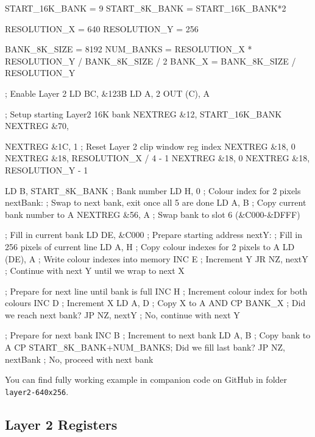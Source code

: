 \begin{tcblisting}{}
START_16K_BANK  = 9
START_8K_BANK   = START_16K_BANK*2

RESOLUTION_X    = 640
RESOLUTION_Y    = 256

BANK_8K_SIZE    = 8192
NUM_BANKS       = RESOLUTION_X * RESOLUTION_Y / BANK_8K_SIZE / 2
BANK_X          = BANK_8K_SIZE / RESOLUTION_Y

    ; Enable Layer 2
    LD BC, &123B
    LD A, 2
    OUT (C), A

    ; Setup starting Layer2 16K bank
    NEXTREG &12, START_16K_BANK
    NEXTREG &70, %

    NEXTREG &1C, 1            ; Reset Layer 2 clip window reg index
    NEXTREG &18, 0
    NEXTREG &18, RESOLUTION_X / 4 - 1
    NEXTREG &18, 0
    NEXTREG &18, RESOLUTION_Y - 1

    LD B, START_8K_BANK       ; Bank number
    LD H, 0                   ; Colour index for 2 pixels
nextBank:
    ; Swap to next bank, exit once all 5 are done
    LD A, B                   ; Copy current bank number to A
    NEXTREG &56, A            ; Swap bank to slot 6 (&C000-&DFFF)

    ; Fill in current bank
    LD DE, &C000              ; Prepare starting address
nextY:
    ; Fill in 256 pixels of current line
    LD A, H                   ; Copy colour indexes for 2 pixels to A
    LD (DE), A                ; Write colour indexes into memory
    INC E                     ; Increment Y
    JR NZ, nextY              ; Continue with next Y until we wrap to next X

    ; Prepare for next line until bank is full
    INC H                     ; Increment colour index for both colours
    INC D                     ; Increment X
    LD A, D                   ; Copy X to A
    AND %
    CP BANK_X                 ; Did we reach next bank?
    JP NZ, nextY              ; No, continue with next Y

    ; Prepare for next bank
    INC B                     ; Increment to next bank
    LD A, B                   ; Copy bank to A
    CP START_8K_BANK+NUM_BANKS; Did we fill last bank?
    JP NZ, nextBank           ; No, proceed with next bank
\end{tcblisting}

You can find fully working example in companion code on GitHub in folder {\tt layer2-640x256}.

\subsection{Layer 2 Registers}
\label{zx_next_layer2_registers}

